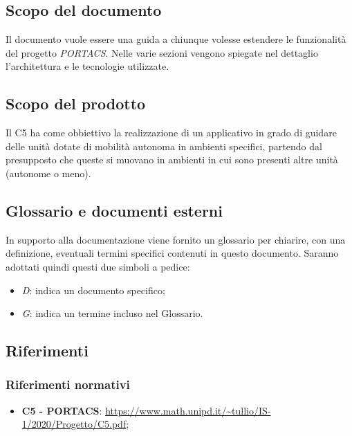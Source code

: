 \subsection{Scopo del documento}
	Il documento vuole essere una guida a chiunque volesse estendere le funzionalità del progetto \textit{PORTACS}. Nelle varie sezioni vengono spiegate nel dettaglio l'architettura e le tecnologie utilizzate.

\subsection{Scopo del prodotto}
	Il  C5 ha come obbiettivo la realizzazione di un applicativo  in grado di guidare delle unità dotate di mobilità autonoma in ambienti specifici, partendo dal presupposto che queste si muovano in ambienti in cui sono presenti altre unità (autonome o meno).

\subsection{Glossario e documenti esterni}
	In supporto alla documentazione viene fornito un glossario per chiarire, con una definizione, eventuali termini specifici contenuti in questo documento.
	Saranno adottati quindi questi due simboli a pedice:
	\begin{itemize}
		\item \textit{D}: indica un documento specifico;
		\item \textit{G}: indica un termine incluso nel Glossario.
	\end{itemize}

\subsection{Riferimenti}
	\subsubsection{Riferimenti normativi}
	\begin{itemize}
		\item \textbf{{ C5 - PORTACS}}: \url{https://www.math.unipd.it/~tullio/IS-1/2020/Progetto/C5.pdf};
	\end{itemize}
